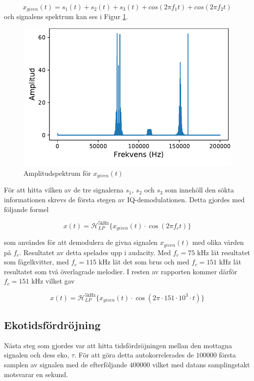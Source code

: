 \documentclass[10pt,twocolumn]{article}
\newcommand{\echodelay}{\tau}
\newcommand{\lpfilter}{\mathcal{H}_{LP}^{5 \text{kHz}}}
\begin{document}
\[
    x_{given}(t) = s_1(t) + s_2(t) + s_3(t) + cos(2\pi f_1 t) + cos(2\pi f_2 t)
\]
och signalens spektrum kan ses i Figur \ref{fig:spectrum}.

\begin{figure}[h]
    \centering
    \includegraphics[width=0.85\linewidth]{spectrum.pdf}
    \caption{Amplitudspektrum för $x_{given}(t)$}
    \label{fig:spectrum}
\end{figure}


För att hitta vilken av de tre signalerna $s_1$, $s_2$ och $s_3$ som innehöll den sökta informationen
skrevs de första stegen av IQ-demodulationen. Detta gjordes med följande formel

\[
    x(t) = \lpfilter\{ x_{given}(t) \cdot \cos(2\pi f_c t) \}
\]


som användes för att demodulera de givna signalen $x_{given}(t)$ med olika värden på $f_c$. Resultatet
av detta spelades upp i audacity. Med $f_c = 75 \text{ kHz}$ lät resultatet som fågelkvitter,
med $f_c = 115 \text{ kHz}$ lät det som brus och med $f_c = 151 \text{ kHz}$ lät resultatet som
två överlagrade melodier. I resten av rapporten kommer därför $f_c = 151\text{ kHz}$ vilket gav

\begin{equation}
    x(t) = \lpfilter\{ x_{given}(t) \cdot \cos(2\pi \cdot 151 \cdot 10^3 \cdot t) \}
\end{equation}



\subsection{Ekotidsfördröjning}
Nästa steg som gjordes var att hitta tidsfördröjningen
mellan den mottagna signalen och dess eko, $\echodelay$.
För att göra detta autokorrelerades de $100000$ första samplen
av signalen med de efterföljande $400000$ vilket med datans samplingstakt motsvarar en sekund.
\end{document}
